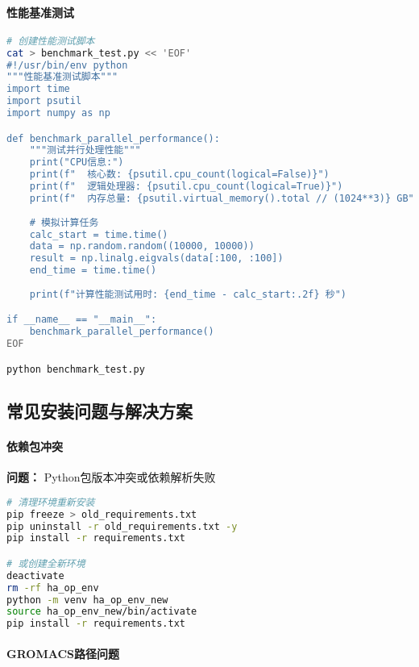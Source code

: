 \paragraph{性能基准测试}

\begin{lstlisting}[language=bash,style=blockstyle]
# 创建性能测试脚本
cat > benchmark_test.py << 'EOF'
#!/usr/bin/env python
"""性能基准测试脚本"""
import time
import psutil
import numpy as np

def benchmark_parallel_performance():
    """测试并行处理性能"""
    print("CPU信息:")
    print(f"  核心数: {psutil.cpu_count(logical=False)}")
    print(f"  逻辑处理器: {psutil.cpu_count(logical=True)}")
    print(f"  内存总量: {psutil.virtual_memory().total // (1024**3)} GB")
    
    # 模拟计算任务
    calc_start = time.time()
    data = np.random.random((10000, 10000))
    result = np.linalg.eigvals(data[:100, :100])
    end_time = time.time()
    
    print(f"计算性能测试用时: {end_time - calc_start:.2f} 秒")

if __name__ == "__main__":
    benchmark_parallel_performance()
EOF

python benchmark_test.py
\end{lstlisting}

\subsection{常见安装问题与解决方案}
\label{subsec:troubleshooting}

\paragraph{依赖包冲突}

\textbf{问题：} Python包版本冲突或依赖解析失败
\begin{lstlisting}[language=bash,style=blockstyle]
# 清理环境重新安装
pip freeze > old_requirements.txt
pip uninstall -r old_requirements.txt -y
pip install -r requirements.txt

# 或创建全新环境
deactivate
rm -rf ha_op_env
python -m venv ha_op_env_new
source ha_op_env_new/bin/activate
pip install -r requirements.txt
\end{lstlisting}

\paragraph{GROMACS路径问题}

